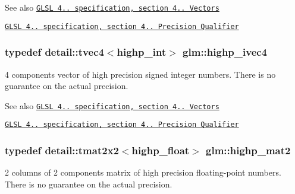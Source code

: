 \begin{DoxySeeAlso}{\-See also}
\href{http://www.opengl.org/registry/doc/GLSLangSpec.4.20.8.pdf}{\tt \-G\-L\-S\-L 4.. specification, section 4.. \-Vectors} 

\href{http://www.opengl.org/registry/doc/GLSLangSpec.4.20.8.pdf}{\tt \-G\-L\-S\-L 4.. specification, section 4.. \-Precision \-Qualifier} 
\end{DoxySeeAlso}
\hypertarget{group__core__precision_ga69b5a957eb1f6a1201cd7eb9a6ac04c5}{
\subsubsection[{highp\-\_\-ivec4}]{\setlength{\rightskip}{0pt plus 5cm}typedef detail\-::tvec4$<$highp\-\_\-int$>$ {\bf glm\-::highp\-\_\-ivec4}}}\label{group__core__precision_ga69b5a957eb1f6a1201cd7eb9a6ac04c5}
4 components vector of high precision signed integer numbers. \-There is no guarantee on the actual precision.

\begin{DoxySeeAlso}{\-See also}
\href{http://www.opengl.org/registry/doc/GLSLangSpec.4.20.8.pdf}{\tt \-G\-L\-S\-L 4.. specification, section 4.. \-Vectors} 

\href{http://www.opengl.org/registry/doc/GLSLangSpec.4.20.8.pdf}{\tt \-G\-L\-S\-L 4.. specification, section 4.. \-Precision \-Qualifier} 
\end{DoxySeeAlso}
\hypertarget{group__core__precision_ga6652bb577f74f322220305a985a8c200}{
\subsubsection[{highp\-\_\-mat2}]{\setlength{\rightskip}{0pt plus 5cm}typedef detail\-::tmat2x2$<$highp\-\_\-float$>$ {\bf glm\-::highp\-\_\-mat2}}}\label{group__core__precision_ga6652bb577f74f322220305a985a8c200}
2 columns of 2 components matrix of high precision floating-\/point numbers. \-There is no guarantee on the actual precision.

